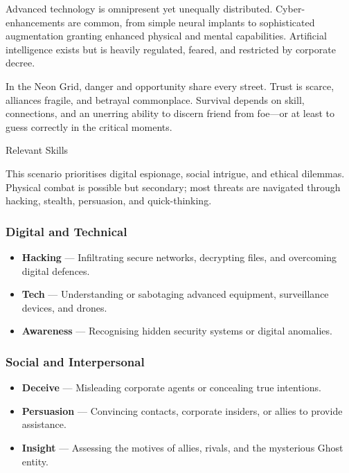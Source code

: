 \documentclass[nodeprecatedcode,bg=print]{dndbook}
\begin{document}
\begin{multicols}{2}
Advanced technology is omnipresent yet unequally distributed. Cyber-enhancements are common, from simple neural implants to sophisticated augmentation granting enhanced physical and mental capabilities. Artificial intelligence exists but is heavily regulated, feared, and restricted by corporate decree.

In the Neon Grid, danger and opportunity share every street. Trust is scarce, alliances fragile, and betrayal commonplace. Survival depends on skill, connections, and an unerring ability to discern friend from foe—or at least to guess correctly in the critical moments.



\begin{CommentBox}{Relevant Skills}\raggedright
    This scenario prioritises digital espionage, social intrigue, and ethical dilemmas. Physical combat is possible but secondary; most threats are navigated through hacking, stealth, persuasion, and quick-thinking.

    \vspace{0.5\baselineskip}

    \subsubsection*{Digital and Technical}
    \begin{itemize}
        \item \textbf{Hacking} — Infiltrating secure networks, decrypting files, and overcoming digital defences.
        \item \textbf{Tech} — Understanding or sabotaging advanced equipment, surveillance devices, and drones.
        \item \textbf{Awareness} — Recognising hidden security systems or digital anomalies.
    \end{itemize}

    \subsubsection*{Social and Interpersonal}
    \begin{itemize}
        \item \textbf{Deceive} — Misleading corporate agents or concealing true intentions.
        \item \textbf{Persuasion} — Convincing contacts, corporate insiders, or allies to provide assistance.
        \item \textbf{Insight} — Assessing the motives of allies, rivals, and the mysterious Ghost entity.
    \end{itemize}


\end{CommentBox}
\end{multicols}
\end{document}
